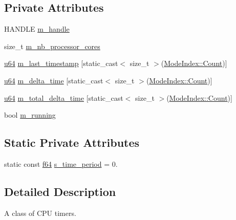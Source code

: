\subsection*{Private Attributes}
\begin{DoxyCompactItemize}
\item 
H\+A\+N\+D\+LE \hyperlink{classmage_1_1_c_p_u_timer_a95b8ac18c050ed25293c8a923087369a}{m\+\_\+handle}
\item 
size\+\_\+t \hyperlink{classmage_1_1_c_p_u_timer_ac5fdb38a70c74815231b5efd8d746be1}{m\+\_\+nb\+\_\+processor\+\_\+cores}
\item 
\hyperlink{namespacemage_aee97da48a07394dd617c9deb60ed2064}{u64} \hyperlink{classmage_1_1_c_p_u_timer_a49e9a8e9684d38bdfca5f4c343de5680}{m\+\_\+last\+\_\+timestamp} \mbox{[}static\+\_\+cast$<$ size\+\_\+t $>$(\hyperlink{classmage_1_1_c_p_u_timer_a98d59db3c396b14269c937e016c7625eae93f994f01c537c4e2f7d8528c3eb5e9}{Mode\+Index\+::\+Count})\mbox{]}
\item 
\hyperlink{namespacemage_aee97da48a07394dd617c9deb60ed2064}{u64} \hyperlink{classmage_1_1_c_p_u_timer_ae26f6009f73955f99f54dae807948eed}{m\+\_\+delta\+\_\+time} \mbox{[}static\+\_\+cast$<$ size\+\_\+t $>$(\hyperlink{classmage_1_1_c_p_u_timer_a98d59db3c396b14269c937e016c7625eae93f994f01c537c4e2f7d8528c3eb5e9}{Mode\+Index\+::\+Count})\mbox{]}
\item 
\hyperlink{namespacemage_aee97da48a07394dd617c9deb60ed2064}{u64} \hyperlink{classmage_1_1_c_p_u_timer_ac2287cfab6d9fc6db131c6ea7c84b389}{m\+\_\+total\+\_\+delta\+\_\+time} \mbox{[}static\+\_\+cast$<$ size\+\_\+t $>$(\hyperlink{classmage_1_1_c_p_u_timer_a98d59db3c396b14269c937e016c7625eae93f994f01c537c4e2f7d8528c3eb5e9}{Mode\+Index\+::\+Count})\mbox{]}
\item 
bool \hyperlink{classmage_1_1_c_p_u_timer_a7190afa453085b7bbd7cb76ff6bb62f2}{m\+\_\+running}
\end{DoxyCompactItemize}
\subsection*{Static Private Attributes}
\begin{DoxyCompactItemize}
\item 
static const \hyperlink{namespacemage_ab935747c6941320bd6214b5a5f265b09}{f64} \hyperlink{classmage_1_1_c_p_u_timer_a23fe9f25f7d24c47a9a5db827ec56ba6}{s\+\_\+time\+\_\+period} = 0.
\end{DoxyCompactItemize}


\subsection{Detailed Description}
A class of C\+PU timers. 

